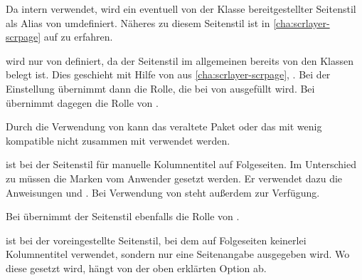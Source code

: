 \begin{description}
  Da  intern
  \hyperref[cha:scrlayer-scrpage]{} verwendet, wird
  ein eventuell von der Klasse bereitgestellter Seitenstil
   als Alias von
   umdefiniert. Näheres zu
  diesem Seitenstil ist in \autoref{cha:scrlayer-scrpage} auf
   zu erfahren.
\item[{\PageStyle{letter}}] %
  wird nur von  definiert, da der
  Seitenstil  im allgemeinen bereits von den Klassen
  belegt ist. Dies geschieht mit Hilfe von
  \hyperref[cha:scrlayer-scrpage]{} aus
  \autoref{cha:scrlayer-scrpage}, . Bei der
  Einstellung %
   übernimmt  dann die Rolle, die bei
   von  ausgefüllt
  wird. Bei %
   übernimmt  dagegen die Rolle von
  .
  
  Durch die Verwendung von
  \hyperref[cha:scrlayer-scrpage]{} kann das
  veraltete Paket  oder das mit
  \KOMAScript{} wenig kompatible \iffalse Paket \fi%
   nicht zusammen mit
   verwendet werden.
\item[{\PageStyle{myheadings}}]
  ist bei  der Seitenstil für
  manuelle Kolumnentitel auf Folgeseiten. Im Unterschied zu 
  müssen die Marken vom Anwender gesetzt werden. Er verwendet dazu die
  Anweisungen  und
  . Bei Verwendung von
  \hyperref[cha:scrlayer-scrpage]{} steht außerdem
   zur Verfügung.

  Bei  übernimmt der
  Seitenstil  ebenfalls die Rolle von
  .
\item[{\PageStyle{plain}}]
  ist bei 
  der voreingestellte Seitenstil, bei dem auf Folgeseiten keinerlei
  Kolumnentitel verwendet, sondern nur eine Seitenangabe ausgegeben wird. Wo
  diese gesetzt wird, hängt von der oben erklärten Option
   ab.


\end{description}
